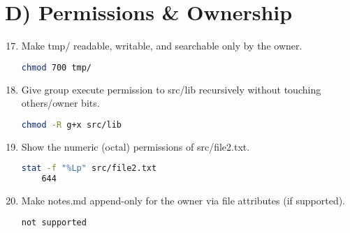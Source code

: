 \section*{D) Permissions \& Ownership}
\begin{enumerate}
\setcounter{enumi}{16}
\item Make tmp/ readable, writable, and searchable only by the owner. \vspace{2em}\\
\begin{lstlisting}[language=sh]
chmod 700 tmp/

\end{lstlisting}
\item Give group execute permission to src/lib recursively without touching others/owner bits. \vspace{2em}\\
\begin{lstlisting}[language=sh]
chmod -R g+x src/lib

\end{lstlisting}
\item Show the numeric (octal) permissions of src/file2.txt. \vspace{2em}\\
\begin{lstlisting}[language=sh]
stat -f "%Lp" src/file2.txt
    644
\end{lstlisting}
\item Make notes.md append-only for the owner via file attributes (if supported). \vspace{2em}\\
\begin{lstlisting}[language=sh]
    not supported
\end{lstlisting}
\end{enumerate}

